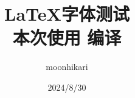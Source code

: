 \documentclass{article}
\begin{document}
\title{ \Huge \LaTeX 字体测试\\ \vspace*{0.5em}
\large 本次使用
\ifLuaTeX
\LuaLaTeX 
\fi
\ifXeTeX
\XeLaTeX 
\fi
编译}
\author{moonhikari}
\date{2024/8/30}
\maketitle

\tableofcontents \newpage

\newpage
\newpage

\end{document}
